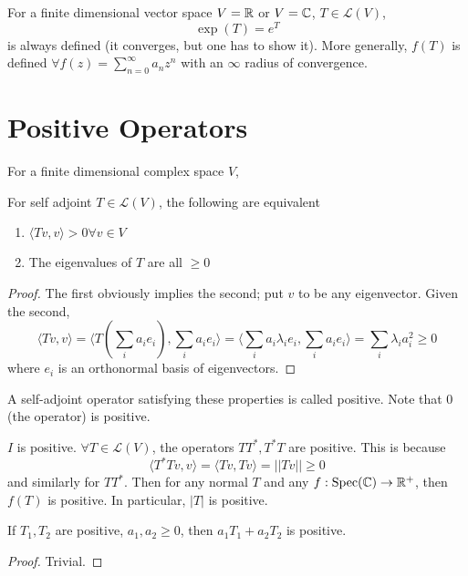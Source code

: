 \documentclass[12pt]{article}
\begin{document}
For a finite dimensional vector space $V = \mathbb{R}$ or $V = \mathbb{C}$, $T \in \mathcal L(V)$,
$$\exp(T) = e^T$$
is always defined (it converges, but one has to show it). More generally, $f(T)$ is defined $\forall f(z) = \sum_{n=0}^\infty a_nz^n$ with an $\infty$ radius of convergence.

\section{Positive Operators}
For a finite dimensional complex space $V$,

\begin{prop}
	For self adjoint $T \in \mathcal L(V)$, the following are equivalent
	\begin{enumerate}
		\item $\langle Tv,v \rangle > 0 \forall v \in V$
		\item The eigenvalues of $T$ are all $\geq 0$
	\end{enumerate}
\end{prop}

\begin{proof}
	The first obviously implies the second; put $v$ to be any eigenvector. Given the second,
	$$\langle Tv,v \rangle = \langle T\left(\sum_i a_ie_i\right),\sum_i a_ie_i \rangle = \langle \sum_i a_i\lambda_ie_i,\sum_i a_ie_i \rangle = \sum_i \lambda_ia_i^2 \geq 0$$
	where $e_i$ is an orthonormal basis of eigenvectors.
\end{proof}

\begin{defn}
	A self-adjoint operator satisfying these properties is called positive. Note that 0 (the operator) is positive.
\end{defn}

\begin{ex}
	$I$ is positive. $\forall T \in \mathcal L(V)$, the operators $TT^*, T^*T$ are positive. This is because
	$$\langle T^*Tv,v \rangle = \langle Tv,Tv \rangle = ||Tv|| \geq 0$$
	and similarly for $TT^*$. Then for any normal $T$ and any $f:\text{Spec}(\mathbb{C}) \rightarrow \mathbb{R}^+$, then $f(T)$ is positive. In particular, $|T|$ is positive.
\end{ex}

\begin{prop}
	If $T_1,T_2$ are positive, $a_1,a_2 \geq 0$, then
	$a_1T_1 + a_2T_2$ is positive.
\end{prop}

\begin{proof}
	Trivial.
\end{proof}
\end{document}
